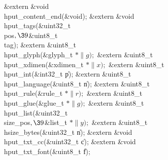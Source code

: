 \&{extern} \&{void} \\{hput\_content\_end}(\&{void});\6
\&{extern} \&{void} \\{hput\_tags}(\&{uint32\_t} \\{pos}${},\39{}$\&{uint8\_t} \\{tag});\6
\&{extern} \&{uint8\_t} \\{hput\_glyph}(\&{glyph\_t} ${}{*}\|g);{}$\6
\&{extern} \&{uint8\_t} \\{hput\_xdimen}(\&{xdimen\_t} ${}{*}\|x);{}$\6
\&{extern} \&{uint8\_t} \\{hput\_int}(\&{int32\_t} \|p);\6
\&{extern} \&{uint8\_t} \\{hput\_language}(\&{uint8\_t} \|n);\6
\&{extern} \&{uint8\_t} \\{hput\_rule}(\&{rule\_t} ${}{*}\|r);{}$\6
\&{extern} \&{uint8\_t} \\{hput\_glue}(\&{glue\_t} ${}{*}\|g);{}$\6
\&{extern} \&{uint8\_t} \\{hput\_list}(\&{uint32\_t} \\{size\_pos}${},\39{}$\&{list\_t} ${}{*}\|y);{}$\6
\&{extern} \&{uint8\_t} \\{hsize\_bytes}(\&{uint32\_t} \|n);\6
\&{extern} \&{void} \\{hput\_txt\_cc}(\&{uint32\_t} \|c);\6
\&{extern} \&{void} \\{hput\_txt\_font}(\&{uint8\_t} \|f);\6
